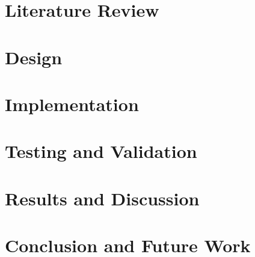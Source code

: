 \documentclass[12pt,a4paper]{report}
\begin{document}
\clearpage



\clearpage


\clearpage


\clearpage


\clearpage


\clearpage



\label{chapter:intro}

\clearpage

\chapter{Literature Review}\label{chapter:literature}
 
\clearpage



\clearpage

\chapter{Design}\label{chapter:design}
 
\clearpage

\chapter{Implementation}\label{chapter:implementation}
 
\clearpage

\chapter{Testing and Validation}\label{chapter:testing} 
\clearpage

\chapter{Results and Discussion}\label{chapter:results}
 
\clearpage

\chapter{Conclusion and Future Work}\label{chapter:conclusion}
 
\clearpage
\end{document}
